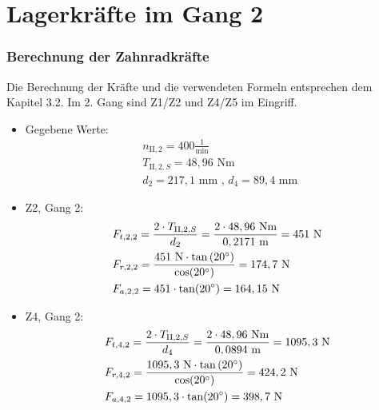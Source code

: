 \section{Lagerkräfte im Gang 2}
\subsubsection{Berechnung der Zahnradkräfte}
Die Berechnung der Kräfte und die verwendeten Formeln entsprechen dem Kapitel 3.2. Im 2. Gang sind Z1/Z2 und Z4/Z5 im Eingriff.
\begin{itemize}
\item Gegebene Werte: 
	\begin{align*}
	&n_{\mathrm{II},2} = 400\frac{1}{\text{min}} \\
	&T_{\mathrm{II},2,S} = 48,96\text{ Nm} \\
	&d_2 = 217,1\text{ mm} \text{ , } d_4 = 89,4 \text{ mm } 
	\end{align*}
\item Z2, Gang 2:
	\begin{align*} 
	&F_{t,2,2} = \frac{2\cdot T_{\mathrm{II},2,S}}{d_2} = \frac{2 \cdot 48,96 \text{ Nm}}{0,2171 \text{ m}} = 451 \text{ N}\\ 
	&F_{r,2,2} = \frac{451 \text{ N} \cdot \tan{(20^\circ)}}{\cos(20^\circ)} = 174,7\text{ N}\\ 
	&F_{a,2,2} =451 \cdot \tan(20^\circ) =164,15 \text{ N}
	\end{align*}
\item Z4, Gang 2:
	\begin{align*} 
	&F_{t,4,2} = \frac{2\cdot T_{\mathrm{II},2,S}}{d_4} = \frac{2 \cdot 48,96 \text{ Nm}}{0,0894 \text{ m}} = 1095,3 \text{ N}\\ 
	&F_{r,4,2} = \frac{1095,3 \text{ N} \cdot \tan{(20^\circ)}}{\cos(20^\circ)} = 424,2\text{ N}\\ 
	&F_{a,4,2} =1095,3 \cdot \tan(20^\circ) =398,7 \text{ N}
	\end{align*}
\end{itemize}
